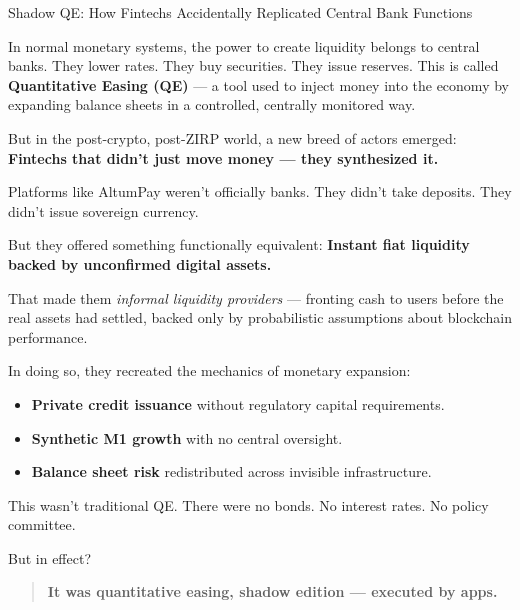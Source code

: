 \begin{HistoricalSidebar}{Shadow QE: How Fintechs Accidentally Replicated Central Bank Functions}

    In normal monetary systems, the power to create liquidity belongs to central banks.  
    They lower rates. They buy securities. They issue reserves.  
    This is called \textbf{Quantitative Easing (QE)} — a tool used to inject money into the economy by expanding balance sheets in a controlled, centrally monitored way.
    
    \medskip
    
    But in the post-crypto, post-ZIRP world, a new breed of actors emerged:  
    \textbf{Fintechs that didn’t just move money — they synthesized it.}
    
    Platforms like AltumPay weren’t officially banks.  
    They didn’t take deposits.  
    They didn’t issue sovereign currency.
    
    But they offered something functionally equivalent:  
    \textbf{Instant fiat liquidity backed by unconfirmed digital assets.}
    
    \medskip
    
    That made them \textit{informal liquidity providers} —  
    fronting cash to users before the real assets had settled,  
    backed only by probabilistic assumptions about blockchain performance.
    
    \medskip
    
    In doing so, they recreated the mechanics of monetary expansion:
    
    \begin{itemize}
      \item \textbf{Private credit issuance} without regulatory capital requirements.
      \item \textbf{Synthetic M1 growth} with no central oversight.
      \item \textbf{Balance sheet risk} redistributed across invisible infrastructure.
    \end{itemize}
    
    \bigskip
    
    This wasn’t traditional QE.  
    There were no bonds. No interest rates. No policy committee.
    
    But in effect?
    
    \begin{quote}
    \textbf{It was quantitative easing, shadow edition — executed by apps.}
    \end{quote}
    

\end{HistoricalSidebar}
